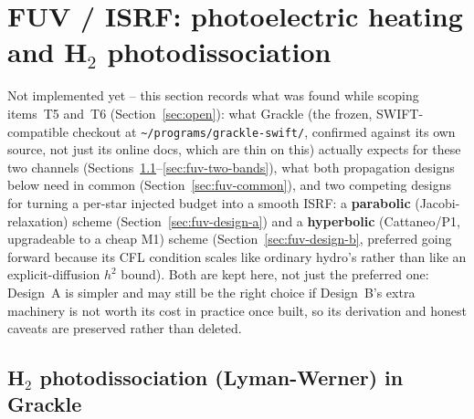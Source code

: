 \section{FUV / ISRF: photoelectric heating and H$_2$ photodissociation}
\label{sec:fuv-isrf}

Not implemented yet -- this section records what was found while scoping
items~T5 and~T6 (Section~\ref{sec:open}): what Grackle (the frozen,
SWIFT-compatible checkout at \texttt{\textasciitilde/programs/grackle-swift/},
confirmed against its own source, not just its online docs, which are
thin on this) actually expects for these two channels
(Sections~\ref{sec:fuv-lw-grackle}--\ref{sec:fuv-two-bands}), what both
propagation designs below need in common
(Section~\ref{sec:fuv-common}), and two competing designs for turning a
per-star injected budget into a smooth ISRF: a \textbf{parabolic}
(Jacobi-relaxation) scheme (Section~\ref{sec:fuv-design-a}) and a
\textbf{hyperbolic} (Cattaneo/P1, upgradeable to a cheap M1) scheme
(Section~\ref{sec:fuv-design-b}, preferred going forward because its
CFL condition scales like ordinary hydro's rather than like an
explicit-diffusion $h^2$ bound). Both are kept here, not just the
preferred one: Design~A is simpler and may still be
the right choice if Design~B's extra machinery is not worth its cost in
practice once built, so its derivation and honest caveats are preserved
rather than deleted.

\subsection{H$_2$ photodissociation (Lyman-Werner) in Grackle}
\label{sec:fuv-lw-grackle}


